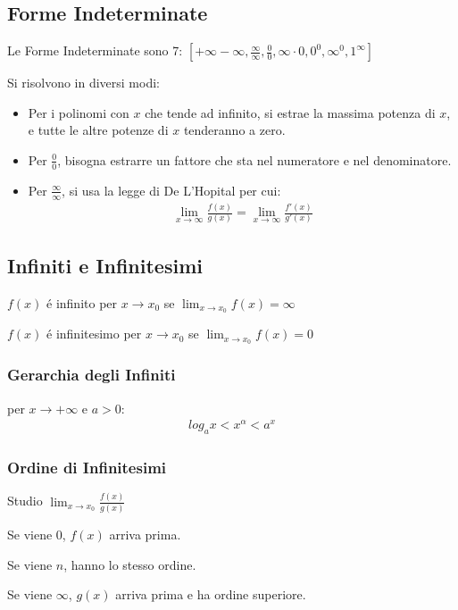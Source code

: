 \documentclass{article}
\begin{document}
\subsection{Forme Indeterminate}
Le Forme Indeterminate sono 7: $[+\infty - \infty, \frac{\infty}{\infty}, \frac{0}{0}, \infty\cdot 0, 0^0, \infty^0, 1^\infty]$

Si risolvono in diversi modi:
\begin{itemize}
    \item Per i polinomi con $x$ che tende ad infinito, si estrae la massima potenza di $x$, e tutte le altre potenze di $x$ tenderanno a zero.
    \item Per $\frac{0}{0}$, bisogna estrarre un fattore che sta nel numeratore e nel denominatore.
    \item Per $\frac{\infty}{\infty}$, si usa la legge di De L'Hopital per cui:
    \begin{gather*}
        \lim_{x\to\infty}\frac{f(x)}{g(x)}=\lim_{x\to\infty}\frac{f'(x)}{g'(x)}
    \end{gather*}
\end{itemize}
\subsection{Infiniti e Infinitesimi}
$f(x)$ é infinito per $x\to x_0$ se $\lim_{x\to x_0} f(x)=\infty$

$f(x)$ é infinitesimo per $x\to x_0$ se $\lim_{x\to x_0} f(x)=0$
\subsubsection{Gerarchia degli Infiniti}
per $x\to+\infty$ e $a>0$:
\begin{gather*}
    log_ax<x^\alpha<a^x
\end{gather*}
\subsubsection{Ordine di Infinitesimi}
Studio $\lim_{x\to x_0}\frac{f(x)}{g(x)}$

Se viene $0$, $f(x)$ arriva prima.

Se viene $n$, hanno lo stesso ordine.

Se viene $\infty$, $g(x)$ arriva prima e ha ordine superiore.
\end{document}

